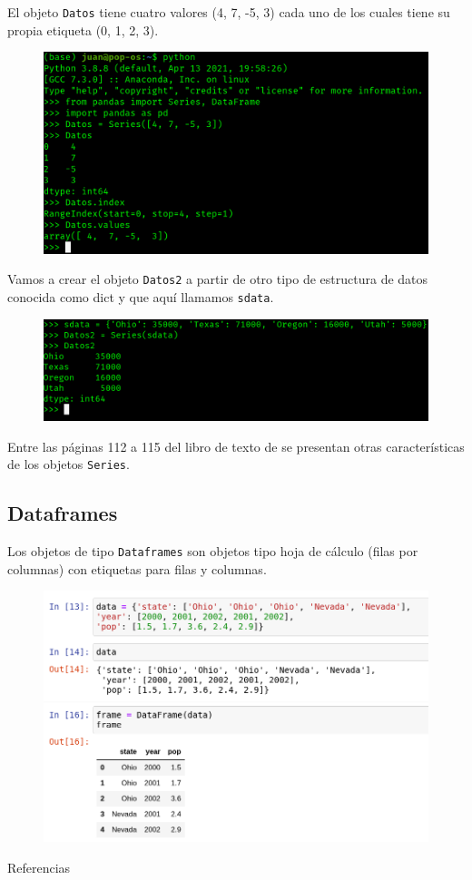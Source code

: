 \documentclass[aspectratio=169]{beamer}
\begin{document}
\begin{frame}
El objeto \texttt{Datos} tiene cuatro valores (4, 7, -5, 3) cada uno de los cuales tiene su propia etiqueta (0, 1, 2, 3).
\begin{figure}
\centering
\includegraphics[width=.8\textwidth]{p2.png}
\end{figure}
\end{frame}


\begin{frame}
Vamos a crear el objeto \texttt{Datos2} a partir de otro tipo de estructura de datos conocida como dict y que aquí llamamos \texttt{sdata}.
\begin{figure}
\centering
\includegraphics[width=.8\textwidth]{p3.png}
\end{figure}
Entre las páginas 112 a 115 del libro de texto de \citeauthor{McKinney2012} \citeyear{McKinney2012} se presentan otras características de los objetos \texttt{Series}.
\end{frame}

\subsection{Dataframes}
\begin{frame}
Los objetos de tipo \texttt{Dataframes} son objetos tipo hoja de cálculo (filas por columnas) con etiquetas para filas y columnas.   
\begin{figure}
\centering
\includegraphics[width=.7\textwidth]{p4.png}
\end{figure}
\end{frame}



\begin{frame}[allowframebreaks]{Referencias}
\tiny

 
\end{frame}
\end{document}
